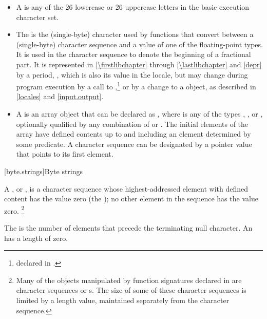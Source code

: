 \begin{itemize}
\item
A  is any of the 26 lowercase or 26
%
%
uppercase letters in the basic execution character set.
\item
The
is the
(single-byte) character used by functions that convert between a (single-byte)
character sequence and a value of one of the floating-point types.
It is used
in the character sequence to denote the beginning of a fractional part.
It is
represented in \ref{\firstlibchapter} through \ref{\lastlibchapter}
and \ref{depr} by a period,
%
,
which is
also its value in the 
locale, but may change during program
execution by a call to
,\footnote{declared in
.
%
}
or by a change to a
object, as described in \ref{locales} and \ref{input.output}.
\item
A
is an array object  that
can be declared as
,
where  is any of the types
,
,
or
, optionally qualified by any combination of
or
.
The initial elements of the
array have defined contents up to and including an element determined by some
predicate.
A character sequence can be designated by a pointer value
 that points to its first element.
\end{itemize}

[byte.strings]{Byte strings}

%
\pnum
A ,
or \ntbs{},
is a character sequence whose highest-addressed element
with defined content has the value zero
(the );
no other element in the sequence has the value zero.%
\footnote{Many of the objects manipulated by
function signatures declared in
 are character sequences or \ntbs{}s.
The size of some of these character sequences is limited by
a length value, maintained separately from the character sequence.}

\pnum
The 
is the number of elements that
precede the terminating null character.
An 
has a length of zero.

